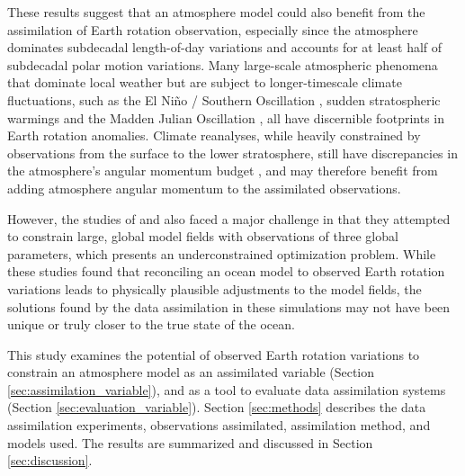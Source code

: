 These results suggest that an atmosphere model could also benefit from the assimilation of Earth rotation observation, especially since the atmosphere dominates subdecadal length-of-day variations and accounts for at least half of subdecadal polar motion variations. 
Many large-scale atmospheric phenomena that dominate local weather but are subject to longer-timescale climate fluctuations, such as 
the El Ni\~no / Southern Oscillation \citep{Chao1984},
sudden stratospheric warmings \citep{Neef2014} and the Madden Julian Oscillation \citep{Weickmann1992}, all have discernible footprints in Earth rotation anomalies. 
Climate reanalyses, while heavily constrained by observations from the surface to the lower stratosphere, still have discrepancies in the atmosphere's angular momentum budget \citep{Berrisford2011,Lehmann2012}, and  may therefore benefit from adding atmosphere angular momentum to the assimilated observations. 

However, the studies of \citet{Saynisch2010,Saynisch2011} and \citet{Saynisch2012} also faced a major challenge in that they attempted to constrain large, global model fields with observations of three global parameters, which presents an underconstrained optimization problem. 
While these studies found that reconciling an ocean model to observed Earth rotation variations leads to physically plausible adjustments to the model fields, the solutions found by the data assimilation in these simulations may not have been unique or truly closer to the true state of the ocean.  

This study examines the potential of observed Earth rotation variations to 
constrain an atmosphere model as an assimilated variable (Section \ref{sec:assimilation_variable}), and
as a tool to evaluate data assimilation systems (Section \ref{sec:evaluation_variable}).
Section \ref{sec:methods} describes the data assimilation experiments, observations assimilated, assimilation method, and models used.
The results are summarized and discussed in Section \ref{sec:discussion}.
